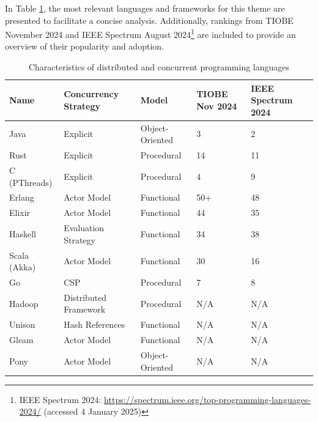In Table \ref{tab:languages_comparison}, the most relevant languages and frameworks for this theme are presented to facilitate a concise analysis. Additionally, rankings from TIOBE November 2024 and IEEE Spectrum August 2024\footnote{IEEE Spectrum 2024: \url{https://spectrum.ieee.org/top-programming-languages-2024/} (accessed 4 January 2025)} are included to provide an overview of their popularity and adoption.

\begin{table}[h!]
    \centering
    \hspace*{-0.2cm}
    \begin{tabular}{|l|p{3.1cm}|p{3.1cm}|p{2cm}|p{2cm}|}
        \hline
        \textbf{Name} & \textbf{Concurrency Strategy} & \textbf{Model}  & \textbf{TIOBE Nov 2024} & \textbf{IEEE Spectrum 2024} \\ \hline
        Java          & Explicit                      & Object-Oriented & 3                       & 2                           \\ \hline
        Rust          & Explicit                      & Procedural      & 14                      & 11                          \\ \hline
        C (PThreads)  & Explicit                      & Procedural      & 4                       & 9                           \\ \hline
        Erlang        & Actor Model                   & Functional      & 50+                     & 48                          \\ \hline
        Elixir        & Actor Model                   & Functional      & 44                      & 35                          \\ \hline
        Haskell       & Evaluation Strategy           & Functional      & 34                      & 38                          \\ \hline
        Scala (Akka)  & Actor Model                   & Functional      & 30                      & 16                          \\ \hline
        Go            & CSP                           & Procedural      & 7                       & 8                           \\ \hline
        Hadoop        & Distributed Framework         & Procedural      & N/A                     & N/A                         \\ \hline
        Unison        & Hash References               & Functional      & N/A                     & N/A                         \\ \hline
        Gleam         & Actor Model                   & Functional      & N/A                     & N/A                         \\ \hline
        Pony          & Actor Model                   & Object-Oriented & N/A                     & N/A                         \\ \hline
    \end{tabular}
    \caption{Characteristics of distributed and concurrent programming languages}
    \label{tab:languages_comparison}
\end{table}

